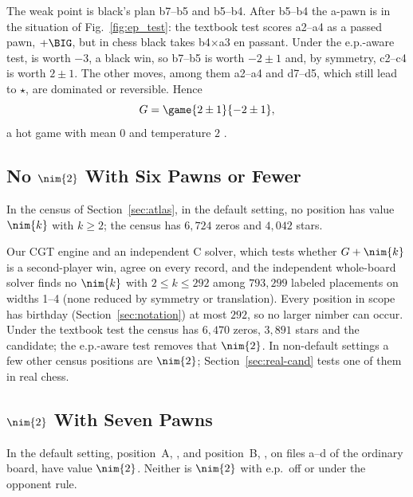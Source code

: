 The weak point is black's plan b7--b5 and b5--b4. After b5--b4 the a-pawn is in the situation of
Fig.~\ref{fig:ep_test}: the textbook test scores a2--a4 as a passed pawn, $+\BIG$, but in chess black takes
b4$\times$a3 en passant. Under the e.p.-aware test,  is worth $-3$, a black win, so
b7--b5 is worth $-2\pm1$ and, by symmetry, c2--c4 is worth $2\pm1$. The other moves, among them a2--a4 and
d7--d5, which still lead to $\star$, are dominated or reversible. Hence
\[
G=\game{2\pm1}{-2\pm1},
\]
a hot game with mean $0$ and temperature $2$ .

\subsection{No \texorpdfstring{$\nim{2}$}{*2} With Six Pawns or Fewer}

\begin{theorem}\label{thm:census}
In the census of Section~\ref{sec:atlas}, in the default setting, no position has value $\nim{k}$ with
$k\ge2$; the census has $6{,}724$ zeros and $4{,}042$ stars.
\end{theorem}

Our CGT engine and an independent C solver, which tests whether $G+\nim{k}$ is a second-player win, agree on
every record, and the independent whole-board solver finds no $\nim{k}$ with $2\le k\le 292$ among
$793{,}299$ labeled placements on widths 1--4 (none reduced by symmetry or translation). Every position in scope has birthday (Section~\ref{sec:notation}) at most $292$, so no
larger nimber can occur. Under the textbook test the census has $6{,}470$ zeros, $3{,}891$ stars and the
candidate; the e.p.-aware test removes that $\nim{2}$. In non-default settings a few other census
positions are $\nim{2}$; Section~\ref{sec:real-cand} tests one of them in real chess.

\subsection{\texorpdfstring{$\nim{2}$}{*2} With Seven Pawns}

\begin{theorem}\label{thm:star2seven}
In the default setting, position~A, , and position~B,
, on files a--d of the ordinary board, have value $\nim{2}$. Neither is $\nim{2}$ with e.p.\ off or under the opponent rule.
\end{theorem}

